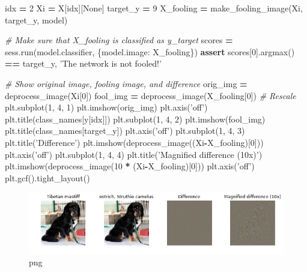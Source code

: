 \documentclass[]{book}
\newenvironment{Shaded}{\begin{snugshade}}{\end{snugshade}}
\newcommand{\DecValTok}[1]{\textcolor[rgb]{0.00,0.00,0.81}{#1}}
\newcommand{\StringTok}[1]{\textcolor[rgb]{0.31,0.60,0.02}{#1}}
\newcommand{\CommentTok}[1]{\textcolor[rgb]{0.56,0.35,0.01}{\textit{#1}}}
\newcommand{\VariableTok}[1]{\textcolor[rgb]{0.00,0.00,0.00}{#1}}
\newcommand{\ControlFlowTok}[1]{\textcolor[rgb]{0.13,0.29,0.53}{\textbf{#1}}}
\newcommand{\OperatorTok}[1]{\textcolor[rgb]{0.81,0.36,0.00}{\textbf{#1}}}
\newcommand{\NormalTok}[1]{#1}
\theoremstyle{definition}
\theoremstyle{definition}
\theoremstyle{definition}
\theoremstyle{remark}
\begin{document}
\begin{Shaded}
\begin{Highlighting}[]
\NormalTok{idx }\OperatorTok{=} \DecValTok{2}
\NormalTok{Xi }\OperatorTok{=}\NormalTok{ X[idx][}\VariableTok{None}\NormalTok{]}
\NormalTok{target_y }\OperatorTok{=} \DecValTok{9}
\NormalTok{X_fooling }\OperatorTok{=}\NormalTok{ make_fooling_image(Xi, target_y, model)}

\CommentTok{# Make sure that X_fooling is classified as y_target}
\NormalTok{scores }\OperatorTok{=}\NormalTok{ sess.run(model.classifier, \{model.image: X_fooling\})}
\ControlFlowTok{assert}\NormalTok{ scores[}\DecValTok{0}\NormalTok{].argmax() }\OperatorTok{==}\NormalTok{ target_y, }\StringTok{'The network is not fooled!'}

\CommentTok{# Show original image, fooling image, and difference}
\NormalTok{orig_img }\OperatorTok{=}\NormalTok{ deprocess_image(Xi[}\DecValTok{0}\NormalTok{])}
\NormalTok{fool_img }\OperatorTok{=}\NormalTok{ deprocess_image(X_fooling[}\DecValTok{0}\NormalTok{])}
\CommentTok{# Rescale }
\NormalTok{plt.subplot(}\DecValTok{1}\NormalTok{, }\DecValTok{4}\NormalTok{, }\DecValTok{1}\NormalTok{)}
\NormalTok{plt.imshow(orig_img)}
\NormalTok{plt.axis(}\StringTok{'off'}\NormalTok{)}
\NormalTok{plt.title(class_names[y[idx]])}
\NormalTok{plt.subplot(}\DecValTok{1}\NormalTok{, }\DecValTok{4}\NormalTok{, }\DecValTok{2}\NormalTok{)}
\NormalTok{plt.imshow(fool_img)}
\NormalTok{plt.title(class_names[target_y])}
\NormalTok{plt.axis(}\StringTok{'off'}\NormalTok{)}
\NormalTok{plt.subplot(}\DecValTok{1}\NormalTok{, }\DecValTok{4}\NormalTok{, }\DecValTok{3}\NormalTok{)}
\NormalTok{plt.title(}\StringTok{'Difference'}\NormalTok{)}
\NormalTok{plt.imshow(deprocess_image((Xi}\OperatorTok{-}\NormalTok{X_fooling)[}\DecValTok{0}\NormalTok{]))}
\NormalTok{plt.axis(}\StringTok{'off'}\NormalTok{)}
\NormalTok{plt.subplot(}\DecValTok{1}\NormalTok{, }\DecValTok{4}\NormalTok{, }\DecValTok{4}\NormalTok{)}
\NormalTok{plt.title(}\StringTok{'Magnified difference (10x)'}\NormalTok{)}
\NormalTok{plt.imshow(deprocess_image(}\DecValTok{10} \OperatorTok{*}\NormalTok{ (Xi}\OperatorTok{-}\NormalTok{X_fooling)[}\DecValTok{0}\NormalTok{]))}
\NormalTok{plt.axis(}\StringTok{'off'}\NormalTok{)}
\NormalTok{plt.gcf().tight_layout()}
\end{Highlighting}
\end{Shaded}

\begin{figure}
\centering
\includegraphics{Network-Visualization-TensorFlow_files/Network-Visualization-TensorFlow_17_0.png}
\caption{png}
\end{figure}
\end{document}

